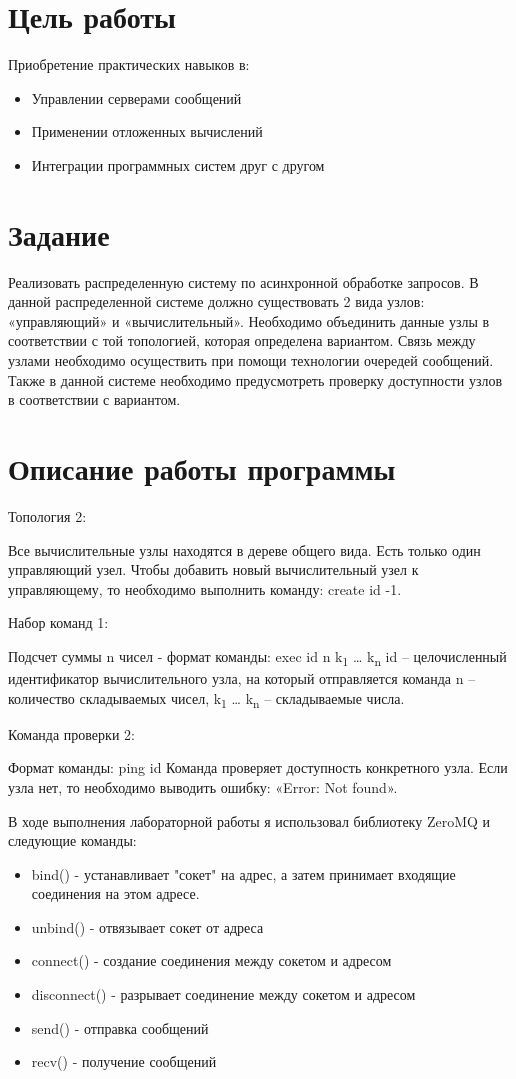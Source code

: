 \documentclass[a4paper, 12pt]{article}
\begin{document}
\section{Цель работы}
Приобретение практических навыков в:
\begin{itemize}
  \item Управлении серверами сообщений
  \item Применении отложенных вычислений
  \item Интеграции программных систем друг с другом
\end{itemize}

\section{Задание}
Реализовать распределенную систему по асинхронной обработке запросов. В данной распределенной системе должно существовать 2 вида узлов: «управляющий» и «вычислительный». Необходимо объединить данные узлы в соответствии с той топологией, которая определена вариантом. Связь между узлами необходимо осуществить при помощи технологии очередей сообщений. Также в данной системе необходимо предусмотреть проверку доступности узлов в соответствии с вариантом.

\section{Описание работы программы}
Топология 2:

Все вычислительные узлы находятся в дереве общего вида. Есть только один управляющий узел. Чтобы добавить новый вычислительный узел к управляющему, то необходимо выполнить команду: create id -1.

Набор команд 1:

Подсчет суммы n чисел - формат команды: exec id n k\textsubscript{1} … k\textsubscript{n} id – целочисленный идентификатор вычислительного узла, на который отправляется команда n – количество складываемых чисел, k\textsubscript{1} … k\textsubscript{n} – складываемые числа.

Команда проверки 2:

Формат команды: ping id Команда проверяет доступность конкретного узла. Если узла нет, то необходимо выводить ошибку: «Error: Not found».

В ходе выполнения лабораторной работы я использовал библиотеку ZeroMQ и следующие команды:
\begin{itemize}
  \item bind() - устанавливает "сокет" на адрес, а затем принимает входящие соединения на этом адресе.
  \item unbind() - отвязывает сокет от адреса
  \item connect() - создание соединения между сокетом и адресом
  \item disconnect() - разрывает соединение между сокетом и адресом
  \item send() - отправка сообщений
  \item recv() - получение сообщений
\end{itemize}
\end{document}
